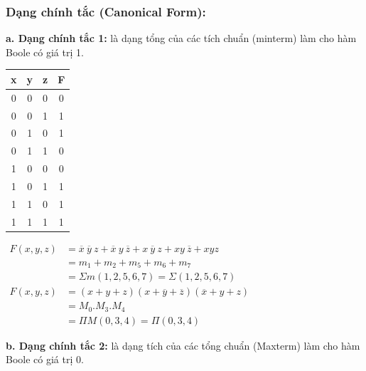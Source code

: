 \subsubsection{Dạng chính tắc (Canonical Form):}
\textbf{a. Dạng chính tắc 1:} là dạng tổng của các tích chuẩn (minterm) làm cho hàm Boole có giá trị 1.
\begin{table}[h!]
    \centering
    \begin{tabular}{|ccc|c|}
    \hline
    \textbf{x} & \textbf{y} & \textbf{z} & \textbf{F} \\ \hline
    0          & 0          & 0          & 0          \\ 
    0          & 0          & 1          & 1          \\ 
    0          & 1          & 0          & 1          \\ 
    0          & 1          & 1          & 0          \\ 
    1          & 0          & 0          & 0          \\ 
    1          & 0          & 1          & 1          \\ 
    1          & 1          & 0          & 1          \\ 
    1          & 1          & 1          & 1          \\ \hline
    \end{tabular}
    \qquad
    $\begin{aligned}
        F(x,y,z) &= \overline{x}\ \overline{y}\ z  + \overline{x}\ y\ \overline{z} + x\ \overline{y}\ z + xy\ \overline{z} + xyz \\
                 &= m_1 + m_2 + m_5 + m_6 + m_7 \\
                 &= \varSigma m(1,2,5,6,7) = \varSigma (1,2,5,6,7) \\
        F(x,y,z) &= (x+y+z)(x+ \overline{y} + \overline{z})(\overline{x} + y + z)\\
                 &= M_0 . M_3 . M_4 \\
                 &= \varPi M(0,3,4) = \varPi (0,3,4)
    \end{aligned}$
\end{table}

\textbf{b. Dạng chính tắc 2:} là dạng tích của các tổng chuẩn (Maxterm) làm cho hàm Boole có giá trị 0.

